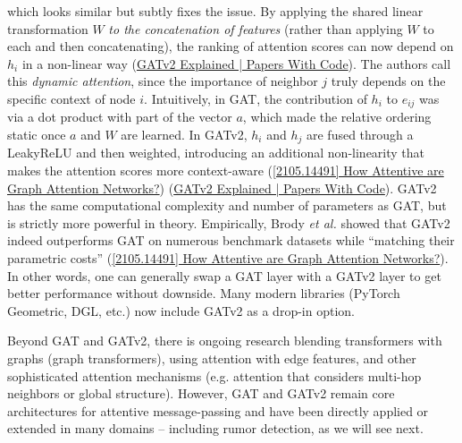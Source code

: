 \documentclass[12pt,a4paper]{report}
\begin{document}
which looks similar but subtly fixes the issue. By applying the shared linear transformation \(W\) \textit{to the concatenation of features} (rather than applying \(W\) to each and then concatenating), the ranking of attention scores can now depend on \(h_i\) in a non-linear way (\href{https://paperswithcode.com/method/gatv2#:~:text=The%20__GATv2__%20operator%20from%20the,top%7D%5Cmathrm%7BLeakyReLU%7D%5Cleft%28%5Cmathbf%7BW%7D%5B%5Cmathbf%7Bh%7D_i%20%5C%2C%20%5CVert%20%5C%2C%5Cmathbf%7Bh%7D_j%5D%5Cright)}{GATv2 Explained | Papers With Code}). The authors call this \textit{dynamic attention}, since the importance of neighbor \(j\) truly depends on the specific context of node \(i\). Intuitively, in GAT, the contribution of \(h_i\) to \(e_{ij}\) was via a dot product with part of the vector \(a\), which made the relative ordering static once \(a\) and \(W\) are learned. In GATv2, \(h_i\) and \(h_j\) are fused through a LeakyReLU and then weighted, introducing an additional non-linearity that makes the attention scores more context-aware (\href{https://arxiv.org/abs/2105.14491#:~:text=given%20its%20own%20representation%20as,a%20dynamic%20graph%20attention%20variant}{[2105.14491] How Attentive are Graph Attention Networks?}) (\href{https://paperswithcode.com/method/gatv2#:~:text=The%20__GATv2__%20operator%20from%20the,top%7D%5Cmathrm%7BLeakyReLU%7D%5Cleft%28%5Cmathbf%7BW%7D%5B%5Cmathbf%7Bh%7D_i%20%5C%2C%20%5CVert%20%5C%2C%5Cmathbf%7Bh%7D_j%5D%5Cright)}{GATv2 Explained | Papers With Code}). GATv2 has the same computational complexity and number of parameters as GAT, but is strictly more powerful in theory. Empirically, Brody \textit{et al.} showed that GATv2 indeed outperforms GAT on numerous benchmark datasets while “matching their parametric costs” (\href{https://arxiv.org/abs/2105.14491#:~:text=the%20order%20of%20operations%20and,at%20%2014%20this%20https}{[2105.14491] How Attentive are Graph Attention Networks?}). In other words, one can generally swap a GAT layer with a GATv2 layer to get better performance without downside. Many modern libraries (PyTorch Geometric, DGL, etc.) now include GATv2 as a drop-in option.

Beyond GAT and GATv2, there is ongoing research blending transformers with graphs (graph transformers), using attention with edge features, and other sophisticated attention mechanisms (e.g. attention that considers multi-hop neighbors or global structure). However, GAT and GATv2 remain core architectures for attentive message-passing and have been directly applied or extended in many domains – including rumor detection, as we will see next.
\end{document}
